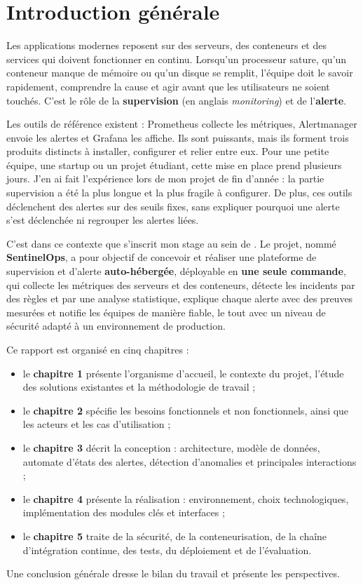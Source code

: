 \chapter*{Introduction générale}

Les applications modernes reposent sur des serveurs, des conteneurs et des services qui
doivent fonctionner en continu. Lorsqu'un processeur sature, qu'un conteneur manque de
mémoire ou qu'un disque se remplit, l'équipe doit le savoir rapidement, comprendre la cause
et agir avant que les utilisateurs ne soient touchés. C'est le rôle de la
\textbf{supervision} (en anglais \emph{monitoring}) et de l'\textbf{alerte}.

Les outils de référence existent : Prometheus collecte les métriques, Alertmanager envoie
les alertes et Grafana les affiche. Ils sont puissants, mais ils forment trois produits
distincts à installer, configurer et relier entre eux. Pour une petite équipe, une startup ou
un projet étudiant, cette mise en place prend plusieurs jours. J'en ai fait l'expérience
lors de mon projet de fin d'année : la partie supervision a été la plus longue et la plus
fragile à configurer. De plus, ces outils déclenchent des alertes sur des seuils fixes, sans
expliquer pourquoi une alerte s'est déclenchée ni regrouper les alertes liées.

C'est dans ce contexte que s'inscrit mon stage au sein de \textbf{\entreprise}. Le projet,
nommé \textbf{SentinelOps}, a pour objectif de concevoir et réaliser une plateforme de
supervision et d'alerte \textbf{auto-hébergée}, déployable en \textbf{une seule commande},
qui collecte les métriques des serveurs et des conteneurs, détecte les incidents par des
règles et par une analyse statistique, explique chaque alerte avec des preuves mesurées et
notifie les équipes de manière fiable, le tout avec un niveau de sécurité adapté à un
environnement de production.

Ce rapport est organisé en cinq chapitres :
\begin{itemize}
  \item le \textbf{chapitre 1} présente l'organisme d'accueil, le contexte du projet,
        l'étude des solutions existantes et la méthodologie de travail ;
  \item le \textbf{chapitre 2} spécifie les besoins fonctionnels et non fonctionnels, ainsi
        que les acteurs et les cas d'utilisation ;
  \item le \textbf{chapitre 3} décrit la conception : architecture, modèle de données,
        automate d'états des alertes, détection d'anomalies et principales interactions ;
  \item le \textbf{chapitre 4} présente la réalisation : environnement, choix
        technologiques, implémentation des modules clés et interfaces ;
  \item le \textbf{chapitre 5} traite de la sécurité, de la conteneurisation, de la chaîne
        d'intégration continue, des tests, du déploiement et de l'évaluation.
\end{itemize}
Une conclusion générale dresse le bilan du travail et présente les perspectives.
